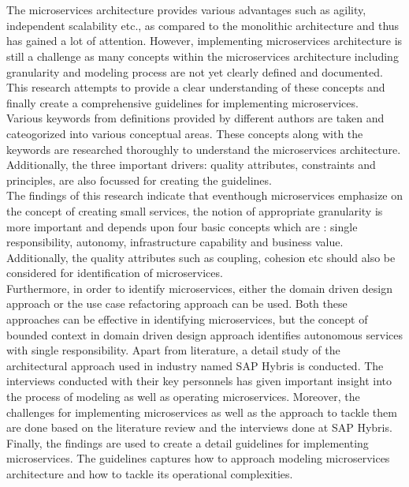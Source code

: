 \chapter{\abstractname}
The microservices architecture provides various advantages such as agility, independent scalability etc., as compared to the monolithic architecture and thus has gained a lot of attention. However, implementing microservices architecture is still a challenge as many concepts within the microservices architecture including granularity and modeling process are not yet clearly defined and documented. This research attempts to provide a clear understanding of these concepts and finally create a comprehensive guidelines for implementing microservices.\\
Various keywords from definitions provided by different authors are taken and cateogorized into various conceptual areas. These concepts along with the keywords are researched thoroughly to understand the microservices architecture. Additionally, the three important drivers: quality attributes, constraints and principles, are also focussed for creating the guidelines.\\
The findings of this research indicate that eventhough microservices emphasize on the concept of creating small services, the notion of appropriate granularity is more important and depends upon four basic concepts which are : single responsibility, autonomy, infrastructure capability and business value. Additionally, the quality attributes such as coupling, cohesion etc should also be considered for identification of microservices.\\
Furthermore, in order to identify microservices, either the domain driven design approach or the use case refactoring approach can be used. Both these approaches can be effective in identifying microservices, but the concept of bounded context in domain driven design approach identifies autonomous services with single responsibility. Apart from literature, a detail study of the architectural approach used in industry named SAP Hybris is conducted. The interviews conducted with their key personnels has given important insight into the process of modeling as well as operating microservices. Moreover, the challenges for implementing microservices as well as the approach to tackle them are done based on the literature review and the interviews done at SAP Hybris.\\
Finally, the findings are used to create a detail guidelines for implementing microservices. The guidelines captures how to approach modeling microservices architecture and how to tackle its operational complexities.